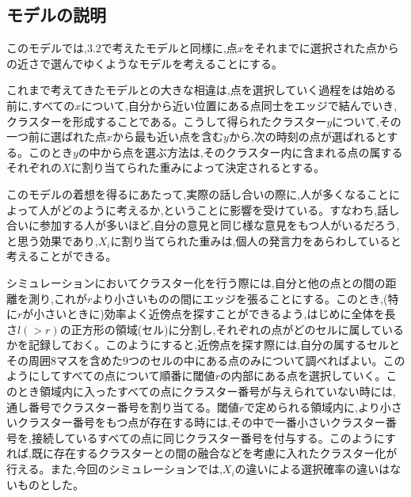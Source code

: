 \subsection{モデルの説明}
このモデルでは,3.2で考えたモデルと同様に,点$x$をそれまでに選択された点からの近さで選んでゆくようなモデルを考えることにする。

これまで考えてきたモデルとの大きな相違は,点を選択していく過程をは始める前に,すべての$x$について,自分から近い位置にある点同士をエッジで結んでいき,クラスターを形成することである。こうして得られたクラスター$y$について,その一つ前に選ばれた点$x$から最も近い点を含む$y$から,次の時刻の点が選ばれるとする。このとき$y$の中から点を選ぶ方法は,そのクラスター内に含まれる点の属するそれぞれの$X$に割り当てられた重みによって決定されるとする。

このモデルの着想を得るにあたって,実際の話し合いの際に,人が多くなることによって人がどのように考えるか,ということに影響を受けている。すなわち,話し合いに参加する人が多いほど,自分の意見と同じ様な意見をもつ人がいるだろう,と思う効果であり,$X_{i}$に割り当てられた重みは,個人の発言力をあらわしていると考えることができる。

シミュレーションにおいてクラスター化を行う際には,自分と他の点との間の距離を測り,これが$r$より小さいものの間にエッジを張ることにする。このとき,(特に$r$が小さいときに)効率よく近傍点を探すことができるよう,はじめに全体を長さ$l(>r)$の正方形の領域(セル)に分割し,それぞれの点がどのセルに属しているかを記録しておく。このようにすると,近傍点を探す際には,自分の属するセルとその周囲8マスを含めた9つのセルの中にある点のみについて調べればよい。このようにしてすべての点について順番に閾値$r$の内部にある点を選択していく。このとき領域内に入ったすべての点にクラスター番号が与えられていない時には,通し番号でクラスター番号を割り当てる。閾値$r$で定められる領域内に,より小さいクラスター番号をもつ点が存在する時には,その中で一番小さいクラスター番号を,接続しているすべての点に同じクラスター番号を付与する。このようにすれば,既に存在するクラスターとの間の融合などを考慮に入れたクラスター化が行える。また,今回のシミュレーションでは,$X_{i}$の違いによる選択確率の違いはないものとした。

